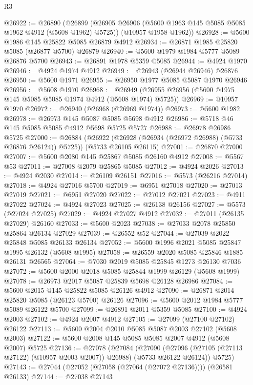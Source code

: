 \begin{lexlean}{R3}
\begin{coremodule}
@26922 := @26890
    (@26899
      (@26905 @26906 (@5600 @1963 @145 @5085 @5085 @1962 @4912 (@5608 @1962) @5725))
      (@10957 @1958 @1962))
@26928 := @5600 @1986 @145 @25822 @5085 @26879 @4912
@26934 := @26871 @1985 @25820 @5085 (@26877 @5700) @26879
@26940 := @5600 @1979 @1984 @5777 @5089 @26876 @5700
@26943 := @26891 @1978 @5359 @5085
@26944 := @4924 @1970
@26946 := @4924 @1974 @4912
@26949 := @26943 (@26944 @26946) @26876
@26950 := @5600 @1971
@26955 := @26950 @1977 @5085 @5087 @1970 @26946
@26956 := @5608 @1970
@26968 := @26949 (@26955 @26956 (@5600 @1975 @145 @5085 @5085 @1974 @4912 (@5608 @1974) @5725))
@26969 := @10957 @1970
@26972 := @26940 (@26968 (@26969 @1974))
@26973 := @5600 @1982
@26978 := @26973 @145 @5087 @5085 @5698 @4912
@26986 := @5718 @46 @145 @5085 @5085 @4912 @5698 @5725 @5727
@26988 := @26978 @26986 @5725
@27000 := @26884
    (@26922 (@26928 (@26934 (@26972 @26988) (@5733 @26876 @26124)) @5725))
    (@5733 @26105 @26115)
@27001 := @26870 @27000
@27007 := @5600 @2080 @145 @25867 @5085 @26160 @4912
@27008 := @5567 @53
@27011 := @27008 @2079 @25865 @5085
@27012 := @4924 @2026
@27013 := @4924 @2030
@27014 := @26109 @26151
@27016 := @5573 (@26216 @27014)
@27018 := @4924 @27016 @5700
@27019 := @6951 @27018
@27020 := @27013 @27019
@27021 := @6951 @27020
@27022 := @27012 @27021
@27023 := @4911 @27022
@27024 := @4924 @27023
@27025 := @26138 @26156
@27027 := @5573 (@27024 @27025)
@27029 := @4924 @27027 @4912
@27032 := @27011 (@26135 @27029) @26160
@27033 := @5600 @2023
@27038 := @27033 @2078 @25850 @25864 @26134 @27029
@27039 := @26552 @52
@27044 := @27039 @2022 @25848 @5085 @26133 @26134
@27052 := @5600 @1996 @2021 @5085 @25847 @1995 @26132 (@5608 @1995)
@27058 := @26559 @2020 @5085 @25846 @1885 @26131 @26565
@27064 := @7030 @2019 @5085 @25845 @1273 @26130 @7036
@27072 := @5600 @2000 @2018 @5085 @25844 @1999 @26129 (@5608 @1999)
@27078 := @26973 @2017 @5087 @25839 @5698 @26128 @26986
@27084 := @5600 @2015 @145 @25822 @5085 @26126 @4912
@27090 := @26871 @2014 @25820 @5085 (@26123 @5700) @26126
@27096 := @5600 @2012 @1984 @5777 @5089 @26122 @5700
@27099 := @26891 @2011 @5359 @5085
@27100 := @4924 @2003
@27102 := @4924 @2007 @4912
@27105 := @27099 (@27100 @27102) @26122
@27113 := @5600 @2004 @2010 @5085 @5087 @2003 @27102 (@5608 @2003)
@27122 := @5600 @2008 @145 @5085 @5085 @2007 @4912 (@5608 @2007) @5725
@27136 := @27078
    (@27084
      (@27090 (@27096 (@27105 (@27113 @27122) (@10957 @2003 @2007)) @26988) (@5733 @26122 @26124))
      @5725)
@27143 := @27044 (@27052 (@27058 (@27064 (@27072 @27136)))) (@26581 @26133)
@27144 := @27038 @27143

\end{coremodule}
\end{lexlean}
